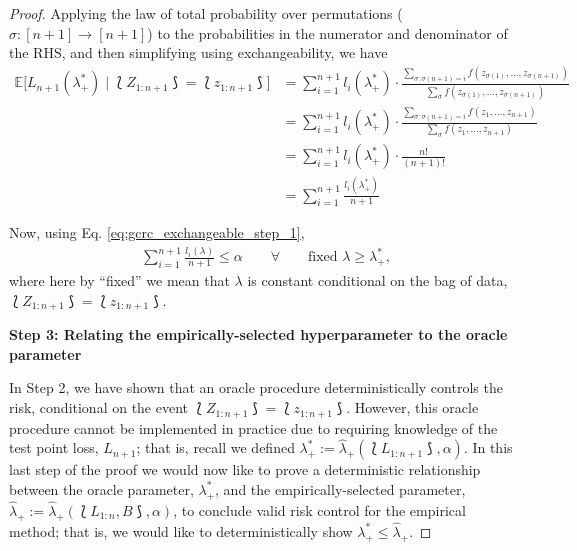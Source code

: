 \begin{proof}
Applying the law of total probability over permutations ($\sigma:[n+1]\rightarrow[n+1]$) to the probabilities in the numerator and denominator of the RHS, and then simplifying using exchangeability, we have
\begin{align*}
    \mathbb{E}\big[L_{n+1}(\lambda_{+}^*) \mid \lbag Z_{1:n+1} \rbag =  \lbag z_{1:n+1} \rbag\big]
    & = \sum_{i=1}^{n+1}l_i(\lambda_{+}^*)\cdot \frac{\sum_{\sigma:\sigma(n+1)=i}f(z_{\sigma(1)}, ..., z_{\sigma(n+1)})}{\sum_{\sigma}f(z_{\sigma(1)}, ..., z_{\sigma(n+1)})} \\
    & = \sum_{i=1}^{n+1}l_i(\lambda_{+}^*)\cdot \frac{\sum_{\sigma:\sigma(n+1)=i}f(z_1, ..., z_{n+1})}{\sum_{\sigma}f(z_1, ..., z_{n+1})} \\
    & = \sum_{i=1}^{n+1}l_i(\lambda_{+}^*)\cdot \frac{n!}{(n+1)!} \\
    & = \sum_{i=1}^{n+1}\frac{l_i(\lambda_{+}^*)}{n+1}
\end{align*}

Now, using Eq. \eqref{eq:gcrc_exchangeable_step_1}, 
\begin{align}\label{eq:gcrc_exchangeable_step_2}
    &\sum_{i=1}^{n+1}\frac{l_{i}(\lambda)}{n+1}\leq \alpha \qquad \forall \qquad \text{fixed } \lambda \geq \lambda_{+}^*,
\end{align}
where here by ``fixed'' we mean that $\lambda$ is constant conditional on the bag of data, $\lbag Z_{1:n+1} \rbag = \lbag z_{1:n+1} \rbag$.

\vspace{1cm}

\textbf{Step 3: Relating the empirically-selected hyperparameter to the oracle parameter}


In Step 2, we have shown that an oracle procedure deterministically controls the risk, conditional on the event $\lbag Z_{1:n+1} \rbag = \lbag z_{1:n+1} \rbag$. However, this oracle procedure cannot be implemented in practice due to requiring knowledge of the test point loss, $L_{n+1}$; that is, recall we defined $\lambda_+^* := \hat{\lambda}_+(\lbag L_{1:n+1} \rbag, \alpha)$. In this last step of the proof we would now like to prove a deterministic relationship between the oracle parameter, $\lambda_+^*$, and the empirically-selected parameter, $\hat{\lambda}_+:=\hat{\lambda}_+(\lbag L_{1:n}, B \rbag, \alpha)$, to conclude valid risk control for the empirical method; that is, we would like to deterministically show $\lambda_+^* \leq \hat{\lambda}_+$.



\end{proof}

